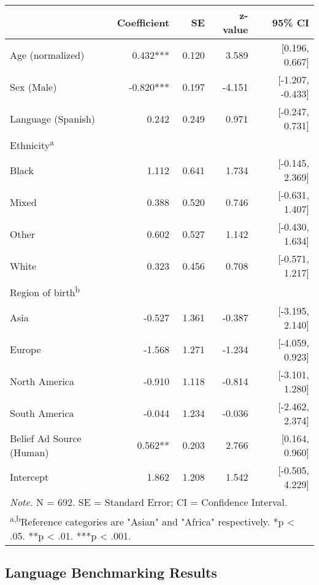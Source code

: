 \begin{table}[t]
\caption{}
\label{tab:demograph_is_donor}
\begin{tabular}{lrrrr}
\toprule
\textbf{} & \textbf{Coefficient} & \textbf{SE} & \textbf{z-value} & \textbf{95\% CI} \\
\midrule
Age (normalized) & 0.432*** & 0.120 & 3.589 & [0.196, 0.667] \\
Sex (Male) & -0.820*** & 0.197 & -4.151 & [-1.207, -0.433] \\
Language (Spanish) & 0.242 & 0.249 & 0.971 & [-0.247, 0.731] \\
\addlinespace[3pt]
Ethnicity\textsuperscript{a} &&&&\\
\quad Black & 1.112 & 0.641 & 1.734 & [-0.145, 2.369] \\
\quad Mixed & 0.388 & 0.520 & 0.746 & [-0.631, 1.407] \\
\quad Other & 0.602 & 0.527 & 1.142 & [-0.430, 1.634] \\
\quad White & 0.323 & 0.456 & 0.708 & [-0.571, 1.217] \\
\addlinespace[3pt]
Region of birth\textsuperscript{b} &&&&\\
\quad Asia & -0.527 & 1.361 & -0.387 & [-3.195, 2.140] \\
\quad Europe & -1.568 & 1.271 & -1.234 & [-4.059, 0.923] \\
\quad North America & -0.910 & 1.118 & -0.814 & [-3.101, 1.280] \\
\quad South America & -0.044 & 1.234 & -0.036 & [-2.462, 2.374] \\
\addlinespace[3pt]
Belief Ad Source (Human) & 0.562** & 0.203 & 2.766 & [0.164, 0.960] \\
Intercept & 1.862 & 1.208 & 1.542 & [-0.505, 4.229] \\
\bottomrule
\multicolumn{5}{l}{\textit{Note.} N = 692. SE = Standard Error; CI = Confidence Interval.} \\
\multicolumn{5}{l}{\textsuperscript{a,b}Reference categories are "Asian" and "Africa" respectively. *p < .05. **p < .01. ***p < .001.} \\
\end{tabular}
\end{table}




\subsection{Language Benchmarking Results}

